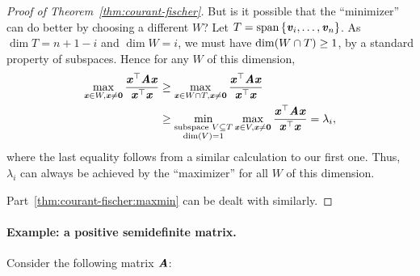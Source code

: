 \begin{proof}[Proof of Theorem~\ref{thm:courant-fischer}]
But is it possible that the ``minimizer'' can do better by choosing
a different $W$?
Let $T = \Span\setof{\vv_i, \ldots,\vv_n}$.
As $\dim{T} = n+1-i$ and $\dim{W} = i$, we must have $\dim{W
  \intersect T} \geq 1$, by a standard property of subspaces.
Hence for any $W$ of this dimension,
\begin{align*}
    \max_{
      \xx \in W, \xx \neq \veczero
    }
    \frac{\xx^\trp \AA\xx}{\xx^\trp\xx}
&\geq
    \max_{
      \xx \in W \intersect T , \xx \neq \veczero
    }
\frac{\xx^\trp \AA\xx}{\xx^\trp\xx}
\\
&\geq  \min_{
      \substack{
        \text{subspace } V \subseteq T
        \\
        \dim{V} = 1
      }
    }
    \max_{
      \xx \in V , \xx \neq \veczero
    }
  \frac{\xx^\trp \AA\xx}{\xx^\trp\xx}
= \lambda_i,
\end{align*}
where the last equality follows from a similar calculation to our
first one.
Thus, $\lambda_i$ can always be achieved by the ``maximizer'' for all
$W$ of this dimension.


Part~\ref{thm:courant-fischer:maxmin} can be dealt with similarly.

\end{proof}

\paragraph{Example: a positive semidefinite matrix.} Consider the
following matrix $\AA$:

